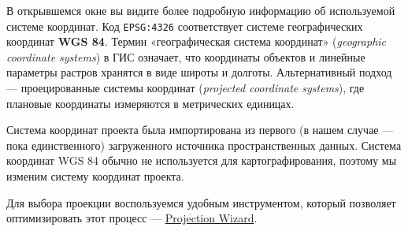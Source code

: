 \documentclass[
  12pt,
]{book}
\begin{document}
В открывшемся окне вы видите более подробную информацию об используемой системе координат. Код \texttt{EPSG:4326} соответствует системе географических координат \textbf{WGS 84}. Термин «географическая система координат» (\emph{geographic coordinate systems}) в ГИС означает, что координаты объектов и линейные параметры растров хранятся в виде широты и долготы. Альтернативный подход --- проецированные системы координат (\emph{projected coordinate systems}), где плановые координаты измеряются в метрических единицах.

Система координат проекта была импортирована из первого (в нашем случае --- пока единственного) загруженного источника пространственных данных. Система координат WGS 84 обычно не используется для картографирования, поэтому мы изменим систему координат проекта.

Для выбора проекции воспользуемся удобным инструментом, который позволяет оптимизировать этот процесс --- \href{http://projectionwizard.org/}{Projection Wizard}.
\end{document}
